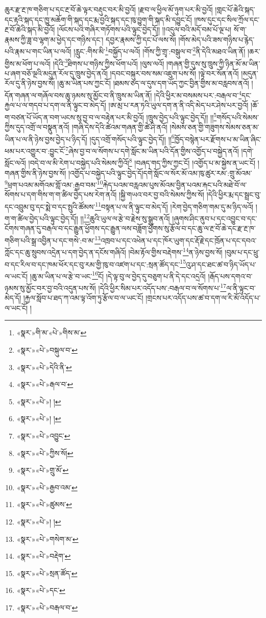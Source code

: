 ཆུར་རྫ་རྔ་ཁ་གཅིག་པ་དང་རྔ་བོ་ཆེ་ལྟར་བརྡུང་བར་མི་བྱའོ། །རྫབ་ལ་ཕྱིལ་མོ་ཉུག་པར་མི་བྱའོ། །གླང་པོ་ཆེའི་སྐད་དང་རྟའི་སྐད་དང་ཁྱུ་མཆོག་གི་སྐད་དང་རྨ་བྱའི་སྐད་དང་ཁུ་བྱུག་གི་སྐད་མི་དབྱུང་ངོ། །ཁས་དུང་དང་སིལ་ཀྲོལ་དང་རྔ་བོ་ཆེའི་སྐད་མི་བྱའོ། །ལོངས་པའི་གཞིར་གཏོགས་པའི་ལྟུང་བྱེད་དོ།། །།འདུལ་བའི་མདོ་བམ་པོ་ལྔ་པ། སོ་ག་རྣམས་ཀྱི་ཟླ་བ་ལྷག་མ་ཕྱེད་དང་གཉིས་དང་། དབྱར་རྣམས་ཀྱི་དང་པོ་ལས་སོ། །གོས་མེད་པའི་ཟས་གཉིས་པ་རྙེད་པའི་རྣམ་པ་གང་ཡིན་པ་ལའོ། །རླུང་:གིས་མི་\footnote{«སྣར་»གི་མ་«པེ་»གིས་མ་}བསྐྱོད་པ་ལའོ། །གོས་ཀྱི་གྲྭ་:བསྒུལ་བ་\footnote{«སྣར་»«པེ་»བསྐུལ་བ་}ནི་དེའི་མཐའ་ཡིན་ནོ། །ཆར་གྱིས་མ་ཕོག་པ་ལའོ། །དེའི་\footnote{«སྣར་»«པེ་»དེའི་ནི་}ཐིགས་པ་གཉིས་ཀྱིས་ཕོག་པའོ། །ལུས་ལའོ། །གཞན་གྱི་དུས་སུ་ཁྲུས་ཀྱི་ཉིན་མོ་མ་ཡིན་པ་ཞག་བཅོ་ལྔའི་མདུན་རོལ་དུ་ཁྲུས་བྱེད་ནའོ། །དབང་བསྐུར་བས་སམ་འཇུག་པས་སོ། །ལྟེ་བར་སོན་ནའོ། །མདུན་རོལ་དུ་ནི་ཉེས་བྱས་སོ། །ཆུ་མ་ཡིན་པས་ཀྱང་ངོ། །ཐམས་ཅད་ལ་དུས་དག་ཡོད་ཀྱང་བྱིན་གྱིས་མ་བརླབས་ནའོ། །དོན་གཞན་ལ་གཞོལ་བས་ཆུ་ཉམས་སུ་མྱོང་བ་ནི་ཁྲུས་མ་ཡིན་ནོ། །དེའི་ཕྱིར་མ་བསམས་པར་:བརྒལ་བ་\footnote{«སྣར་»«པེ་»རྒལ་བ་}དང་རྐྱལ་པ་ལ་གདབ་པ་དག་ལ་ནི་ལྟུང་བ་མེད་དོ། །ཨ་མྲ་པ་རན་ཏའི་ཡུལ་དག་ན་ནི་འདི་མེད་པར་ཤེས་པར་བྱའོ། །ཆོ་ག་བཙན་པོ་ཡོད་ན་བག་ཡངས་སུ་བྱ་བ་ལ་བརྟེན་པར་མི་བྱའོ། །ཁྲུས་བྱེད་པའི་ལྟུང་བྱེད་དོ།། །།\footnote{«སྣར་»«པེ་»། །}གསོད་པའི་སེམས་ཀྱིས་དུད་འགྲོ་ལ་བསྣུན་ནའོ། །གཞི་དེས་དེའི་ཚེའམ་གཞན་གྱི་ཚེ་ཤི་ནའོ། །སེམས་ཅན་གྱི་གཟུགས་སེམས་ཅན་མ་ཡིན་པ་ལ་ནི་ཉེས་བྱས་བྱེད་པ་ཉིད་དོ། །དུད་འགྲོ་གསོད་པའི་ལྟུང་བྱེད་དོ།། །།\footnote{«སྣར་»«པེ་»། །}ཁྱོད་བསྙེན་པར་རྫོགས་པ་མ་ཡིན་ཞིང་ཕམ་པར་འགྱུར་བ་:བྱུང་ངོ་\footnote{«སྣར་»«པེ་»འབྱུང་}ཞེས་བྱ་བ་ལ་སོགས་པ་དགེ་སློང་མ་ཡིན་པའི་དོན་གྱིས་འགྱོད་པ་བསྐྱེད་ནའོ། །དགེ་སློང་ལའོ། །བདེ་བ་ལ་མི་རེག་པ་བསྐྱེད་པའི་སེམས་ཀྱིའོ།\footnote{«སྣར་»«པེ་»ཀྱིས་སོ།} །བཞད་གད་ཀྱིས་ཀྱང་ངོ། །འགྱོད་པ་མ་སྐྱེས་ན་ཡང་ངོ། །གཞན་གྱིས་ནི་ཉེས་བྱས་སོ། །འགྱོད་པ་བསྐྱེད་པའི་ལྟུང་བྱེད་དོ།དགེ་སློང་ལ་སོར་མོ་འམ་ཁུ་ཚུར་རམ་:གྲུ་མོའམ་\footnote{«སྣར་»«པེ་»གྲུ་མོ་}ཕྲག་པའམ་མགོའམ་གློ་འམ་:རྒྱབ་བམ་\footnote{«སྣར་»«པེ་»རྒྱབ་འམ་}རྐེད་པའམ་བརླའམ་པུས་མོའམ་བྱིན་པའམ་རྐང་པའི་མཐེ་བོ་ལ་སོགས་པ་དག་གིས་ག་ག་ཚིལ་བྱེད་པས་རེག་ནའོ། །སྐྱི་གཡའ་བར་བྱ་བའི་སེམས་ཀྱིས་སོ། །དེའི་ཕྱིར་རྨ་དང་སྦྲང་བུ་དང་འབྲུམ་བུ་དང་སྨེ་བ་དང་སྤུའི་ཚོམས་\footnote{«སྣར་»«པེ་»ཚུམས་}བསྟན་པ་ལ་ནི་ལྟུང་བ་མེད་དོ། །རེག་བྱེད་གཅིག་གམ་དུ་མ་ཉིད་ལའོ། །ག་ག་ཚིལ་བྱེད་པའི་ལྟུང་བྱེད་དོ།། །།\footnote{«སྣར་»«པེ་»། །}ཆུའི་ཡུལ་ལ་རྩེ་བ་རྗེས་སུ་སྒྲུབ་ནའོ། །ཞུགས་ཤིང་ནུབ་པ་དང་འབྱུང་བ་དང་ངོགས་གཞན་དུ་བརྒལ་བ་དང་རྒྱུན་ཕྱོགས་དང་རྒྱུན་ལས་བཟློག་ཕྱོགས་སུ་རྩོལ་བ་དང་ཆུ་ལ་རྔ་བོ་ཆེ་དང་རྫ་རྔ་ཁ་གཅིག་པའི་སྒྲ་འབྱིན་པ་དང་གསེ་:བ་མ་\footnote{«སྣར་»«པེ་»གསེག་མ་}འཁྲབ་པ་དང་འཕེན་པ་དང་ཁོར་ཡུག་དང་རྡོ་རྗེ་དང་ཁྲོན་པ་དང་དབའ་ཀློང་དང་ཆུ་སྲུབས་འདྲེན་པ་དག་བྱེད་ན་དངོས་གཞིའོ། །བེམ་རྟོལ་གྱིས་བརྡེགས་\footnote{«སྣར་»«པེ་»བརྡེག་}ན་ཉེས་བྱས་སོ། །བུམ་པ་དང་ཕྲུ་བ་དང་རིལ་བ་དང་ཁམ་ཕོར་དང་བུ་རམ་གྱི་ཁུ་བ་འཛག་པ་དང་:སྲན་ཚོད་དང་\footnote{«སྣར་»«པེ་»སྲན་ཚོད་}འུ་ཤ་དང་ཐང་ཚ་བ་ཉིད་ཡོད་པ་ལ་ཡང་ངོ། །ཆུ་མ་ཡིན་པ་ལ་རྩེ་བ་ཡང་\footnote{«སྣར་»«པེ་»དང་}ངོ། །དེ་ལྟ་བུ་ལ་བྱེད་དུ་བཅུག་པ་ནི་དེ་དང་འདྲའོ། །རྒོད་པས་དགའ་བ་ཉམས་སུ་མྱོང་བར་བྱ་བའི་འདུན་པས་སོ། །དེའི་ཕྱིར་སིམ་པར་འདོད་པས་:བརྒལ་བ་ལ་སོགས་པ་\footnote{«སྣར་»«པེ་»བརྒལ་བ་}ལ་ནི་ལྟུང་བ་མེད་དོ། །རྐྱལ་སློབ་པ་ཐད་ཀ་འམ་ལྟ་འོག་ཏུ་རྩོལ་བ་ལ་ཡང་ངོ། །གྲངས་པར་འདོད་པས་ཚ་བ་དག་ལ་རི་མོ་འདོད་པ་ལ་ཡང་ངོ། །
